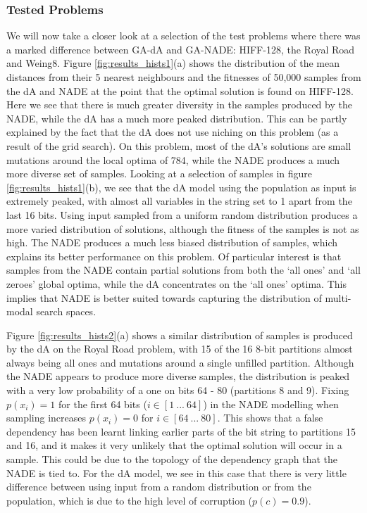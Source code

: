 \documentclass[twoside]{article}
\begin{document}
\subsubsection{Tested Problems}

We will now take a closer look at a selection of the test problems where there was a marked difference between GA-dA and GA-NADE: HIFF-128, the Royal Road and Weing8. Figure \ref{fig:results_hists1}(a) shows the distribution of the mean distances from their 5 nearest neighbours and the fitnesses of 50,000 samples from the dA and NADE at the point that the optimal solution is found on HIFF-128. Here we see that there is much greater diversity in the samples produced by the NADE, while the dA has a much more peaked distribution. This can be partly explained by the fact that the dA does not use niching on this problem (as a result of the grid search). On this problem, most of the dA's solutions are small mutations around the local optima of 784, while the NADE produces a much more diverse set of samples. Looking at a selection of samples in figure \ref{fig:results_hists1}(b), we see that the dA model using the population as input is extremely peaked, with almost all variables in the string set to 1 apart from the last 16 bits. Using input sampled from a uniform random distribution produces a more varied distribution of solutions, although the fitness of the samples is not as high. The NADE produces a much less biased distribution of samples, which explains its better performance on this problem. Of particular interest is that samples from the NADE contain partial solutions from both the `all ones' and `all zeroes' global optima, while the dA concentrates on the `all ones' optima. This implies that NADE is better suited towards capturing the distribution of multi-modal search spaces.

Figure \ref{fig:results_hists2}(a) shows a similar distribution of samples is produced by the dA on the Royal Road problem, with 15 of the 16 8-bit partitions almost always being all ones and mutations around a single unfilled partition. Although the NADE appears to produce more diverse samples, the distribution is peaked with a very low probability of a one on bits 64 - 80 (partitions 8 and 9). Fixing \(p(x_i)=1\) for the first 64 bits (\(i\in{[1\ ...\ 64]}\)) in the NADE modelling when sampling increases \(p(x_i)=0\) for \(i\in{[64\ ...\ 80]}\). This shows that a false dependency has been learnt linking earlier parts of the bit string to partitions 15 and 16, and it makes it very unlikely that the optimal solution will occur in a sample. This could be due to the topology of the dependency graph that the NADE is tied to. For the dA model, we see in this case that there is very little difference between using input from a random distribution or from the population, which is due to the high level of corruption (\(p(c)=0.9\)).
\end{document}
